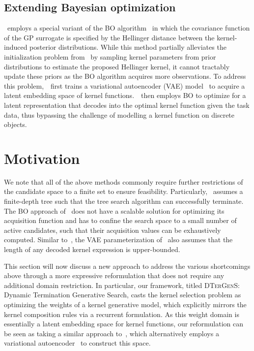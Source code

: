 \subsection{Extending Bayesian optimization}
\citet{Malkomes16}~employs a special variant of the BO algorithm~\cite{Snoek12} in which the covariance function of the GP surrogate is specified by the Hellinger distance between  the kernel-induced posterior distributions. While this method partially alleviates the initialization problem from~\citet{Duvenaud13} by sampling kernel parameters from prior distributions to estimate the proposed Hellinger kernel, it cannot tractably update these priors as the BO algorithm acquires more observations. To address this problem,~\citet{Lu18}~first trains a variational autoencoder (VAE) model~\cite{Kingma13} to acquire a latent embedding space of kernel functions.~\citet{Lu18}~then employs BO to optimize for a latent representation that decodes into the optimal kernel function given the task data, thus bypassing the challenge of modelling a kernel function on discrete objects. 

\section{Motivation} 
We note that all of the above methods commonly require further restrictions of the candidate space to a finite set to ensure feasibility. Particularly,~\citet{Duvenaud13} assumes a finite-depth tree such that the tree search algorithm can successfully terminate. The BO approach of~\citet{Malkomes16} does not have a scalable solution for optimizing its acquisition function and has to confine the search space to a small number of active candidates, such that their acquisition values can be exhaustively computed. Similar to~\citet{Duvenaud13}, the VAE parameterization of~\citet{Lu18} also assumes that the length of any decoded kernel expression is upper-bounded.

This section will now discuss a new approach to address the various shortcomings above through a more expressive reformulation that does not require any additional domain restriction. In particular, our framework, titled \textsc{DTerGenS}: Dynamic Termination Generative Search, casts the kernel selection problem as optimizing the weights of a kernel generative model, which explicitly mirrors the kernel composition rules via a recurrent formulation. As this weight domain is essentially a latent embedding space for kernel functions, our reformulation can be seen as taking a similar approach to~\citet{Lu18}, which alternatively employs a variational autoencoder~\cite{Kingma13} to construct this space.

